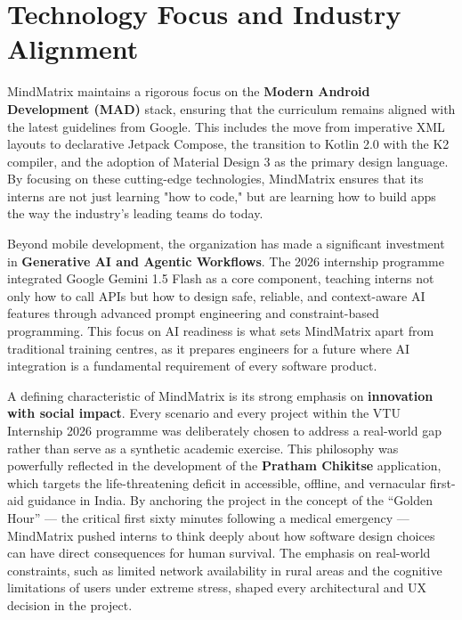 \documentclass[12pt,a4paper]{report}
\begin{document}
\vspace{0.4cm}

\section{Technology Focus and Industry Alignment}

MindMatrix maintains a rigorous focus on the \textbf{Modern Android Development (MAD)} stack, ensuring that the curriculum remains aligned with the latest guidelines from Google. This includes the move from imperative XML layouts to declarative Jetpack Compose, the transition to Kotlin 2.0 with the K2 compiler, and the adoption of Material Design 3 as the primary design language. By focusing on these cutting-edge technologies, MindMatrix ensures that its interns are not just learning "how to code," but are learning how to build apps the way the industry's leading teams do today.

\vspace{0.4cm}

Beyond mobile development, the organization has made a significant investment in \textbf{Generative AI and Agentic Workflows}. The 2026 internship programme integrated Google Gemini 1.5 Flash as a core component, teaching interns not only how to call APIs but how to design safe, reliable, and context-aware AI features through advanced prompt engineering and constraint-based programming. This focus on AI readiness is what sets MindMatrix apart from traditional training centres, as it prepares engineers for a future where AI integration is a fundamental requirement of every software product.

\vspace{0.4cm}

A defining characteristic of MindMatrix is its strong emphasis on \textbf{innovation with social impact}. Every scenario and every project within the VTU Internship 2026 programme was deliberately chosen to address a real-world gap rather than serve as a synthetic academic exercise. This philosophy was powerfully reflected in the development of the \textbf{Pratham Chikitse} application, which targets the life-threatening deficit in accessible, offline, and vernacular first-aid guidance in India. By anchoring the project in the concept of the ``Golden Hour'' — the critical first sixty minutes following a medical emergency — MindMatrix pushed interns to think deeply about how software design choices can have direct consequences for human survival. The emphasis on real-world constraints, such as limited network availability in rural areas and the cognitive limitations of users under extreme stress, shaped every architectural and UX decision in the project.
\end{document}
